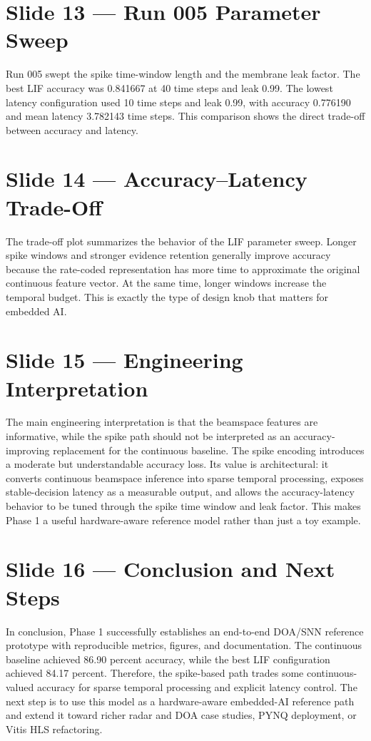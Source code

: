\documentclass[11pt]{article}
\begin{document}
\section*{Slide 13 --- Run 005 Parameter Sweep}

Run 005 swept the spike time-window length and the membrane leak factor. The best LIF accuracy was 0.841667 at 40 time steps and leak 0.99. The lowest latency configuration used 10 time steps and leak 0.99, with accuracy 0.776190 and mean latency 3.782143 time steps. This comparison shows the direct trade-off between accuracy and latency.

\section*{Slide 14 --- Accuracy--Latency Trade-Off}

The trade-off plot summarizes the behavior of the LIF parameter sweep. Longer spike windows and stronger evidence retention generally improve accuracy because the rate-coded representation has more time to approximate the original continuous feature vector. At the same time, longer windows increase the temporal budget. This is exactly the type of design knob that matters for embedded AI.

\section*{Slide 15 --- Engineering Interpretation}

The main engineering interpretation is that the beamspace features are informative, while the spike path should not be interpreted as an accuracy-improving replacement for the continuous baseline. The spike encoding introduces a moderate but understandable accuracy loss. Its value is architectural: it converts continuous beamspace inference into sparse temporal processing, exposes stable-decision latency as a measurable output, and allows the accuracy-latency behavior to be tuned through the spike time window and leak factor. This makes Phase 1 a useful hardware-aware reference model rather than just a toy example.

\section*{Slide 16 --- Conclusion and Next Steps}

In conclusion, Phase 1 successfully establishes an end-to-end DOA/SNN reference prototype with reproducible metrics, figures, and documentation. The continuous baseline achieved 86.90 percent accuracy, while the best LIF configuration achieved 84.17 percent. Therefore, the spike-based path trades some continuous-valued accuracy for sparse temporal processing and explicit latency control. The next step is to use this model as a hardware-aware embedded-AI reference path and extend it toward richer radar and DOA case studies, PYNQ deployment, or Vitis HLS refactoring.
\end{document}
